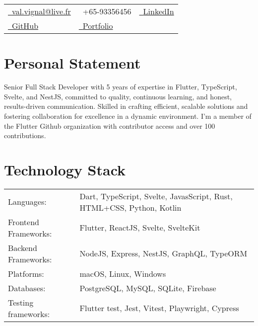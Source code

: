 \documentclass[a4paper,11pt]{article}
\makeatletter
\newcommand{\email}{val.vignal@live.fr}
\makeatother
\begin{document}

\par{\bigskip\par}


\begin{tabularx}{\textwidth}{X X X}
  \href{mailto:\email}{\raisebox{0.0\height}{\footnotesize \faEnvelope}\ {\email}}                   & {\raisebox{0.0\height}{\footnotesize \faPhone}\ +65-93356456}                                                  & \href{https://www.linkedin.com/in/valentin-vignal/}{\raisebox{0.0\height}{\footnotesize \faLinkedin}\ {LinkedIn}} \\
  \href{https://github.com/ValentinVignal}{\raisebox{0.0\height}{\footnotesize \faGithub}\ {GitHub}} & \href{https://valentinvignal.github.io/portfolio/}{\raisebox{0.0\height}{\footnotesize \faGlobe}\ {Portfolio}}                                                                                                                     \\
\end{tabularx}


\section{\textbf{Personal Statement}}
Senior Full Stack Developer with 5 years
of expertise in Flutter, TypeScript, Svelte, and NestJS, committed to quality, continuous
learning, and honest, results-driven communication. Skilled in crafting
efficient, scalable solutions and fostering collaboration for excellence in a
dynamic environment.
I'm a member of the Flutter Github organization with contributor access and over 100
contributions.


\section{\textbf{Technology Stack}}

\begin{tabular}{@{}l l}
  Languages:           & Dart, TypeScript, Svelte, JavasScript, Rust, HTML+CSS, Python, Kotlin \\
  Frontend Frameworks: & Flutter, ReactJS, Svelte, SvelteKit                                   \\
  Backend Frameworks:  & NodeJS, Express, NestJS, GraphQL, TypeORM                             \\
  Platforms:           & macOS, Linux, Windows                                                 \\
  Databases:           & PostgreSQL, MySQL, SQLite, Firebase                                   \\
  Testing frameworks:  & Flutter test, Jest, Vitest, Playwright, Cypress                       \\
\end{tabular}
\end{document}
